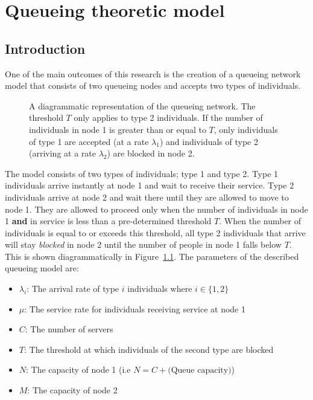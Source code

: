 \chapter{Queueing theoretic model}\label{sec:queueing_section}

\section{Introduction}

One of the main outcomes of this research is the creation of a queueing network
model that consists of two queueing nodes and accepts two types of individuals.

\begin{figure}[H]
    \centering
    
    \caption{A diagrammatic representation of the queueing network.
    The threshold \(T\) only applies to type 2 individuals.
    If the number of individuals in node 1 is greater than or equal to
    \(T\), only individuals of type 1 are accepted (at a rate \(\lambda_1\))
    and individuals of type 2 (arriving at a rate \(\lambda_2\)) are blocked in
    node 2.}
    \label{fig:diagram_of_queueing_system}
\end{figure}

The model consists of two types of individuals; type 1 and type 2.
Type 1 individuals arrive instantly at node 1 and wait to receive their
service.
Type 2 individuals arrive at node 2 and wait there until they are
allowed to move to node 1.
They are allowed to proceed only when the number of
individuals in node 1 \textbf{and} in service is less than a
pre-determined threshold \(T\).
When the number of individuals is equal to or exceeds this threshold, all
type 2 individuals that arrive will stay \textit{blocked} in node 2
until the number of people in node 1 falls below \(T\).
This is shown diagrammatically in Figure~\ref{fig:diagram_of_queueing_system}.
The parameters of the described queueing model are:

\begin{itemize}
    \item \(\lambda_i\): The arrival rate of type \(i\) individuals where
    \(i\in\{1, 2\}\)
    \item \(\mu\): The service rate for individuals receiving service at
    node 1
    \item \(C\): The number of servers
    \item \(T\): The threshold at which individuals of the second type are
    blocked
    \item \(N\): The capacity of node 1 (i.e \(N=C + 
    \text{(Queue capacity)}\))
    \item \(M\): The capacity of node 2
\end{itemize}

